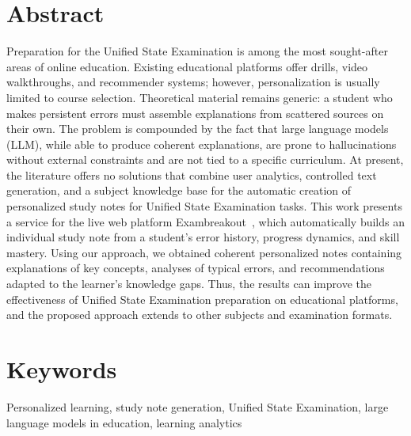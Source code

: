 \documentclass[a4paper,12pt]{extarticle}
\begin{document}
\section*{Abstract}
Preparation for the Unified State Examination is among the most sought-after 
areas of online education. Existing educational platforms offer drills, video walkthroughs, 
and recommender systems; however, personalization is usually limited to course selection. 
Theoretical material remains generic: a student who makes persistent errors must assemble 
explanations from scattered sources on their own. The problem is compounded by the fact that 
large language models (LLM), while able to produce coherent explanations, are prone to 
hallucinations without external constraints and are not tied to a specific curriculum. 
At present, the literature offers no solutions that combine user analytics, controlled 
text generation, and a subject knowledge base for the automatic creation of personalized 
study notes for Unified State Examination tasks. This work presents a service for the live 
web platform Exambreakout~\cite{exambreakout2026}, which automatically builds an individual 
study note from a student's error history, progress dynamics, and skill mastery. Using our approach, 
we obtained coherent personalized notes containing explanations of key concepts, analyses 
of typical errors, and recommendations adapted to the learner's knowledge gaps. Thus, the results 
can improve the effectiveness of Unified State Examination preparation on educational platforms, 
and the proposed approach extends to other subjects and examination formats.


\section*{Keywords}
Personalized learning, study note generation, Unified State Examination, 
large language models in education, learning analytics
\pagebreak
\end{document}
